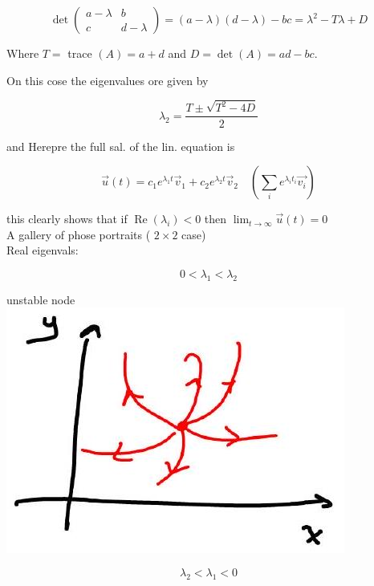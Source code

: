 \documentclass[10pt]{article}
\begin{document}
$$
\operatorname{det}\left(\begin{array}{cc}
a-\lambda & b \\
c & d-\lambda
\end{array}\right)=(a-\lambda)(d-\lambda)-b c=\lambda^{2}-T \lambda+D
$$

Where $T=$ trace $(A)=a+d$ and $D=\operatorname{det}(A)=a d-b c$.

On this cose the eigenvalues ore given by

$$
\lambda_{2}=\frac{T \pm \sqrt{T^{2}-4 D}}{2}
$$

and Herepre the full sal. of the lin. equation is

$$
\vec{u}(t)=c_{1} e^{\lambda_{1} t} \vec{v}_{1}+c_{2} e^{\lambda_{2} t} \vec{v}_{2} \quad\left(\sum_{i} e^{\lambda_{i} t_{i}} \overrightarrow{v_{i}}\right)
$$

this clearly shows that if $\operatorname{Re}\left(\lambda_{i}\right)<0$ then $\lim _{t \rightarrow \infty} \vec{u}(t)=0$\\
A gallery of phose portraits ( $2 \times 2$ case)\\
Real eigenvals:

$$
0<\lambda_{1}<\lambda_{2}
$$

unstable node\\
\includegraphics[max width=\textwidth, center]{2025_10_19_55a7d61d84e6ce9a1c8cg-4(2)}

$$
\lambda_{2}<\lambda_{1}<0
$$
\end{document}
